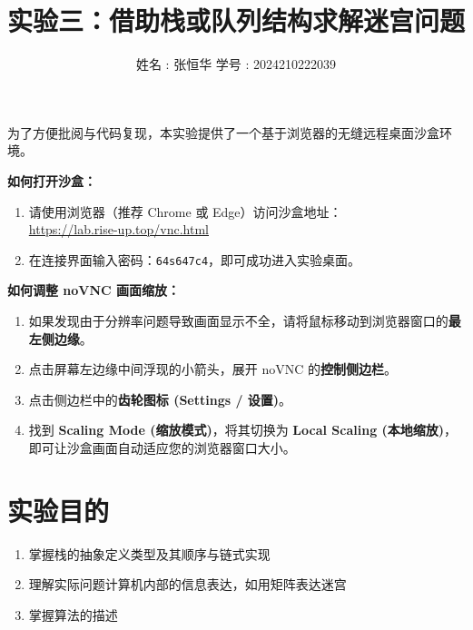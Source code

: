 \documentclass[12pt,a4paper]{ctexart}
\title{\vspace{-2cm} \textbf{实验三：借助栈或队列结构求解迷宫问题}}
\author{姓名 : 张恒华 \quad 学号 : 2024210222039}
\begin{document}
	
	\maketitle
	
	\begin{tcolorbox}[colback=gray!5,colframe=gray!50!black,title=\textbf{实验复现沙盒使用提示}]
		为了方便批阅与代码复现，本实验提供了一个基于浏览器的无缝远程桌面沙盒环境。
		
		\textbf{如何打开沙盒：}
		\begin{enumerate}
			\item 请使用浏览器（推荐 Chrome 或 Edge）访问沙盒地址：\\
			\url{https://lab.rise-up.top/vnc.html}
			\item 在连接界面输入密码：\texttt{64s647c4}，即可成功进入实验桌面。
		\end{enumerate}
		
		\textbf{如何调整 noVNC 画面缩放：}
		\begin{enumerate}
			\item 如果发现由于分辨率问题导致画面显示不全，请将鼠标移动到浏览器窗口的\textbf{最左侧边缘}。
			\item 点击屏幕左边缘中间浮现的小箭头，展开 noVNC 的\textbf{控制侧边栏}。
			\item 点击侧边栏中的\textbf{齿轮图标 (Settings / 设置)}。
			\item 找到 \textbf{Scaling Mode (缩放模式)}，将其切换为 \textbf{Local Scaling (本地缩放)}，即可让沙盒画面自动适应您的浏览器窗口大小。
		\end{enumerate}
	\end{tcolorbox}
	
	\vspace{1em}
	
	\section{实验目的}
	\begin{enumerate}
		\item 掌握栈的抽象定义类型及其顺序与链式实现
		\item 理解实际问题计算机内部的信息表达，如用矩阵表达迷宫
		\item 掌握算法的描述
	\end{enumerate}
	
\end{document}
